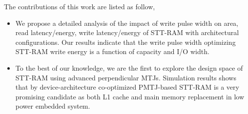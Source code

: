 The contributions of this work are listed as follow,
\begin{itemize}
\item We propose a detailed analysis of the impact of write pulse width on area, read latency/energy, write latency/energy of STT-RAM with architectural configurations. Our results indicate that the write pulse width optimizing STT-RAM write energy is a function of capacity and I/O width.
\item To the best of our knowledge, we are the first to explore the design space of STT-RAM using advanced perpendicular MTJs. Simulation results shows that by device-architecture co-optimized PMTJ-based STT-RAM is a very promising candidate as both L1 cache and main memory replacement in low power embedded system.
\end{itemize} 